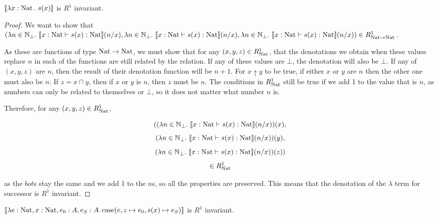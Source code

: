 \vspace{0.5cm}

\begin{lem}
$\llbracket \lambda x : \operatorname{Nat} . \ s(x) \rrbracket$ is $R^1$ invariant.
\end{lem}

\vspace{0.25cm}

\begin{proof} 
We want to show 
 that  $(\lambda n \in \mathbb{N}_{\bot}. \ \llbracket x : \operatorname{Nat} \vdash s(x) : \operatorname{Nat} \rrbracket (n/x),\lambda n \in \mathbb{N}_{\bot}. \ \llbracket x : \operatorname{Nat} \vdash s(x) : \operatorname{Nat} \rrbracket (n/x), \lambda n \in \mathbb{N}_{\bot}. \ \llbracket x : \operatorname{Nat} \vdash s(x) : \operatorname{Nat} \rrbracket (n/x)) \in R_{\operatorname{Nat} \to \operatorname{Nat}}^1$. 
 
As these are functions of type $\operatorname{Nat} \to \operatorname{Nat}$, we must show that for any $(x,y,z) \in R_{\operatorname{Nat}}^1$, that the denotations we obtain when these values replace $n$ in each of the functions are still related by the relation. If any of these values are $\bot$, the denotation will also be $\bot$. If any of $(x,y,z)$ are $n$, then the result of their denotation function will be $n+1$. For $x \uparrow y$ to be true, if either $x$ or $y$ are $n$ then the other one must also be $n$. If $z = x \sqcap y$, then if $x$ or $y$ is $n$, then $z$ must be $n$. The conditions in $R_{\operatorname{Nat}}^1$ still be true if we add 1 to the value that is $n$, as  numbers can only be related to themselves or $\bot$, so it does not matter what number $n$ is.

Therefore, for any $(x,y,z) \in R_{\operatorname{Nat}}^1$,

 \[((\lambda n \in \mathbb{N}_{\bot}. \ \llbracket x : \nat \vdash s(x) : \nat \rrbracket (n/x)) (x),\]
 \[(\lambda n \in \mathbb{N}_{\bot}. \ \llbracket x : \nat \vdash s(x) : \nat \rrbracket (n/x)) (y), \]
 \[(\lambda n \in \mathbb{N}_{\bot}. \ \llbracket x : \nat \vdash s(x) : \nat \rrbracket (n/x))(z))\]
 \[ \in R_{\operatorname{Nat}}^1\]
 
as the $bot$s stay the same and we add 1 to the $n$s, so all the properties are preserved. This means that the denotation of the $\lambda$ term for successor is $R^1$ invariant.
\end{proof}

\vspace{0.5cm}

\begin{lem}
$\llbracket \lambda e : \operatorname{Nat}, x : \operatorname{Nat}, e_0 : A, e_S : A. \operatorname{case} (e, z \mapsto e_0, s(x) \mapsto e_S) \rrbracket$ is $R^1$ invariant.
\end{lem}


